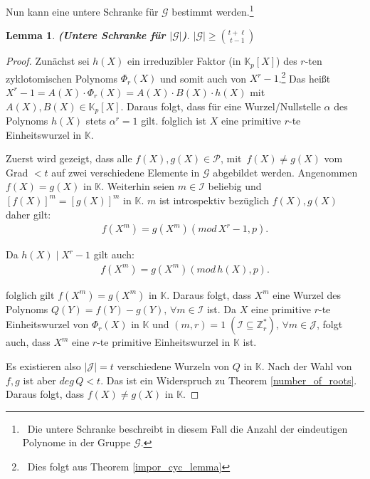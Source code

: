 \documentclass[12pt,oneside]{article}
\newtheorem{lemma}[theorem]{Lemma}
\theoremstyle{remark}
\theoremstyle{definition}
\begin{document}
Nun kann  eine untere Schranke für $\mathcal{G}$ bestimmt werden.\footnote{$\,$ Die untere Schranke beschreibt in diesem Fall die Anzahl der eindeutigen Polynome in der Gruppe $\mathcal{G}$.}\newline

\begin{lemma}\label{lemma47}
\textbf{(Untere Schranke für $|\mathcal{G}|$)}.\newline
$|\mathcal{G}| \geq {t + \ell \choose t - 1}$
\end{lemma}

\begin{proof}
Zunächst sei $h(X)$ ein irreduzibler Faktor (in $\mathbb{K}_{p}[X]$) des $r$-ten zyklotomischen Polynoms $\Phi_r (X)$ und somit auch von $X^r - 1$.\footnote{$\,$ Dies folgt aus Theorem \ref{impor_cyc_lemma}} Das heißt $X^r - 1 = A(X) \cdot \Phi_{r}(X)= A(X) \cdot B(X) \cdot h(X)$ mit $A(X),B(X) \in \mathbb{K}_p[X]$. Daraus folgt, dass für eine Wurzel/Nullstelle $\alpha$ des Polynoms $h(X)$ stets $\alpha^r = 1$ gilt. folglich ist $X$ eine primitive $r$-te Einheitswurzel in $\mathbb{K}$.

Zuerst wird gezeigt, dass alle $f(X),g(X) \in \mathcal{P}$, mit $\, f(X) \neq g(X)$ vom Grad $ < t$ auf zwei verschiedene Elemente in $\mathcal{G}$ abgebildet werden.\newline\newline
Angenommen $f(X) = g(X)$ in $\mathbb{K}$. Weiterhin seien $m \in \mathcal{I}$ beliebig und $[f(X)]^m = [g(X)]^m$ in $\mathbb{K}$. $m$ ist introspektiv bezüglich $f(X), g(X)$ daher gilt:
\begin{align*}
    f(X^m) = g(X^m) (mod \, X^r - 1,p).
\end{align*}

 Da $h(X) \mid X^r - 1$ gilt auch:
\begin{align*}
    f(X^m) = g(X^m) (mod \, h(X),p).
\end{align*}



folglich gilt $f(X^m) = g(X^m)$ in $\mathbb{K}$. Daraus folgt, dass $X^m$ eine Wurzel des Polynoms $Q(Y) = f(Y) - g(Y), \, \forall m \in \mathcal{I}$ ist. Da $X$ eine primitive $r$-te Einheitswurzel von $\Phi_r(X)$ in $\mathbb{K}$ und $(m,r) = 1\; (\mathcal{I} \subseteq \mathbb{Z}_{r}^*), \, \forall m \in \mathcal{J}$, folgt auch, dass $X^m$ eine $r$-te primitive Einheitswurzel in $\mathbb{K}$ ist.

Es existieren also $|\mathcal{J}| = t$ verschiedene Wurzeln von $Q$ in $\mathbb{K}$. Nach der Wahl von $f,g$ ist aber $deg \, Q < t$. Das ist ein Widerspruch zu Theorem \ref{number_of_roots}. Daraus folgt, dass $f(X) \neq g(X)$ in $\mathbb{K}$.


\end{proof}
\end{document}
